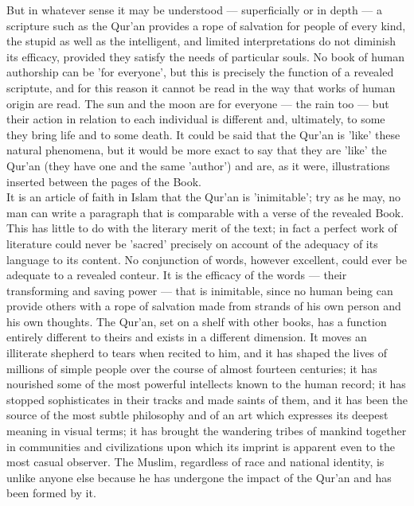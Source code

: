 \documentclass[11pt, b5paper, twoside]{book}
\begin{document}
But in whatever sense it may be understood --- superficially or in depth --- a scripture such as the 
Qur'an provides a rope of salvation for people of every kind, the stupid as well as the intelligent, 
and limited interpretations do not diminish its efficacy, provided they satisfy the needs of 
particular souls. No book of human authorship can be 'for everyone', but this is precisely the 
function of a revealed scriptute, and for this reason it cannot be read in the way that works of 
human origin are read. The sun and the moon are for everyone --- the rain too --- but their action in 
relation to each individual is different and, ultimately, to some they bring life and to some death. 
It could be said that the Qur'an is 'like' these natural phenomena, but it would be more exact to say 
that they are 'like' the Qur'an (they have one and the same 'author') and are, as it were, illustrations inserted between the pages of the Book. \\

It is an article of faith in Islam that the Qur'an is 'inimitable'; try as he may, no man can write a 
paragraph that is comparable with a verse of the revealed Book. This has little to do with the 
literary merit of the text; in fact a perfect work of literature could never be 'sacred' precisely on 
account of the adequacy of its language to its content. No conjunction of words, however excellent, 
could ever be adequate to a revealed conteur. It is the efficacy of the words --- their transforming 
and saving power --- that is inimitable, since no human being can provide others with a rope of 
salvation made from strands of his own person and his own thoughts. The Qur'an, set on a shelf with 
other books, has a function entirely different to theirs and exists in a different dimension. It 
moves an illiterate shepherd to tears when recited to him, and it has shaped the lives of millions of 
simple people over the course of almost fourteen centuries; it has nourished some of the most 
powerful intellects known to the human record; it has stopped sophisticates in their tracks and made 
saints of them, and it has been the source of the most subtle philosophy and of an art which 
expresses its deepest meaning in visual terms; it has brought the wandering tribes of mankind 
together in communities and civilizations upon which its imprint is apparent even to the most casual 
observer. The Muslim, regardless of race and national identity, is unlike anyone else because he has 
undergone the impact of the Qur'an and has been formed by it. \\
\end{document}

